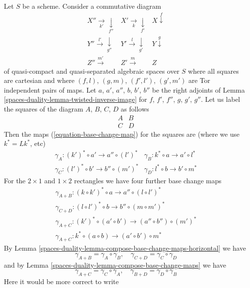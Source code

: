 \begin{remark}
Let $S$ be a scheme. Consider a commutative diagram
$$
\begin{array}{ccc}X'' \underset{k'}{\longrightarrow}\underset{f''}{\downarrow} & X' \underset{k}{\longrightarrow}\underset{f'}{\downarrow} & X \overset{f}{\downarrow} \\ Y'' \overset{l'}{\longrightarrow}\underset{g''}{\downarrow} & Y' \overset{l}{\longrightarrow}\underset{g'}{\downarrow} & Y \overset{g}{\downarrow} \\ Z'' \overset{m'}{\longrightarrow} & Z' \overset{m}{\longrightarrow} & Z\end{array}
$$
of quasi-compact and quasi-separated algebraic spaces over $S$ where
all squares are cartesian and where
$(f, l)$, $(g, m)$, $(f', l')$, $(g', m')$ are
Tor independent pairs of maps.
Let $a$, $a'$, $a''$, $b$, $b'$, $b''$ be the
right adjoints of Lemma \ref{spaces-duality-lemma-twisted-inverse-image}
for $f$, $f'$, $f''$, $g$, $g'$, $g''$.
Let us label the squares of the diagram $A$, $B$, $C$, $D$
as follows
$$
\begin{matrix}
A & B \\
C & D
\end{matrix}
$$
Then the maps (\ref{equation-base-change-map})
for the squares are (where we use $k^* = Lk^*$, etc)
$$
\begin{matrix}
\gamma_A : (k')^* \circ a' \to a'' \circ (l')^* &
\gamma_B : k^* \circ a \to a' \circ l^* \\
\gamma_C : (l')^* \circ b' \to b'' \circ (m')^* &
\gamma_D : l^* \circ b \to b' \circ m^*
\end{matrix}
$$
For the $2 \times 1$ and $1 \times 2$ rectangles we have four further
base change maps
$$
\begin{matrix}
\gamma_{A + B} : (k \circ k')^* \circ a \to a'' \circ (l \circ l')^* \\
\gamma_{C + D} : (l \circ l')^* \circ b \to b'' \circ (m \circ m')^* \\
\gamma_{A + C} : (k')^* \circ (a' \circ b') \to (a'' \circ b'') \circ (m')^* \\
\gamma_{A + C} : k^* \circ (a \circ b) \to (a' \circ b') \circ m^*
\end{matrix}
$$
By Lemma \ref{spaces-duality-lemma-compose-base-change-maps-horizontal} we have
$$
\gamma_{A + B} = \gamma_A \circ \gamma_B, \quad
\gamma_{C + D} = \gamma_C \circ \gamma_D
$$
and by Lemma \ref{spaces-duality-lemma-compose-base-change-maps} we have
$$
\gamma_{A + C} = \gamma_C \circ \gamma_A, \quad
\gamma_{B + D} = \gamma_D \circ \gamma_B
$$
Here it would be more correct to write

\end{remark}
